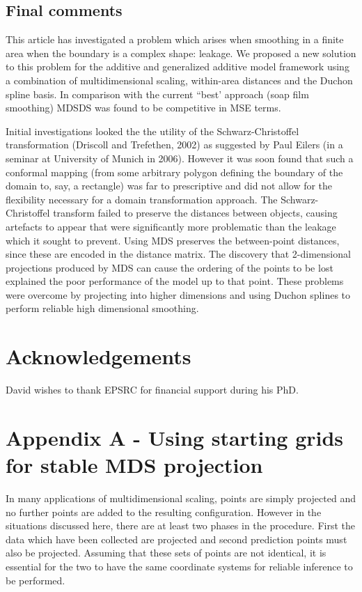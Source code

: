 \documentclass[useAMS, referee]{biom}
\begin{document}
\subsection{Final comments}

This article has investigated a problem which arises when smoothing in a finite area when the boundary is a complex shape: leakage. We proposed a new solution to this problem for the additive and generalized additive model framework using a combination of multidimensional scaling, within-area distances and the Duchon spline basis. In comparison with the current ``best' approach (soap film smoothing) MDSDS was found to be competitive in MSE terms.

Initial investigations looked the the utility of the Schwarz-Christoffel transformation (Driscoll and Trefethen, 2002) as suggested by Paul Eilers (in a seminar at University of Munich in 2006). However it was soon found that such a conformal mapping (from some arbitrary polygon defining the boundary of the domain to, say, a rectangle) was far to prescriptive and did not allow for the flexibility necessary for a domain transformation approach. The Schwarz-Christoffel transform failed to preserve the distances between objects, causing artefacts to appear that were significantly more problematic than the leakage which it sought to prevent. Using MDS preserves the between-point distances, since these are encoded in the distance matrix. The discovery that 2-dimensional projections produced by MDS can cause the ordering of the points to be lost explained the poor performance of the model up to that point. These problems were overcome by projecting into higher dimensions and using Duchon splines to perform reliable high dimensional smoothing.


\section*{Acknowledgements}

David wishes to thank EPSRC for financial support during his PhD.


\section*{Appendix A - Using starting grids for stable MDS projection}

In many applications of multidimensional scaling, points are simply projected and no further points are added to the resulting configuration. However in the situations discussed here, there are at least two phases in the procedure. First the data which have been collected are projected and second prediction points must also be projected. Assuming that these sets of points are not identical, it is essential for the two to have the same coordinate systems for reliable inference to be performed. 
\end{document}
